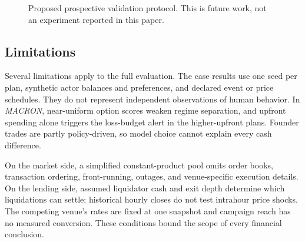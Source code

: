 \begin{figure}[t]
\centering
{}
\caption{Proposed prospective validation protocol. This is future work,
not an experiment reported in this paper.}
\label{fig:validation}
\end{figure}

\subsection{Limitations}
Several limitations apply to the full evaluation. The case results use one
seed per plan, synthetic actor balances and preferences, and declared event or
price schedules. They do not represent independent observations of human
behavior. In \textit{MACRON}, near-uniform option scores weaken regime
separation, and upfront spending alone triggers the loss-budget alert in the
higher-upfront plans. Founder trades are partly policy-driven, so model choice
cannot explain every cash difference.

On the market side, a simplified constant-product pool omits order books,
transaction ordering, front-running, outages, and venue-specific execution
details. On the lending side, assumed liquidator cash and exit depth determine
which liquidations can settle; historical hourly closes do not test intrahour
price shocks. The competing venue's rates are fixed at one snapshot and campaign
reach has no measured conversion. These conditions bound the scope of every
financial conclusion.

